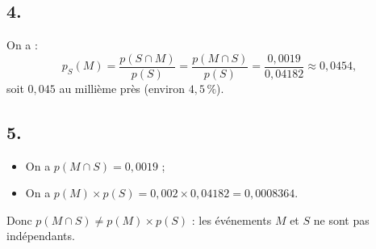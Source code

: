 \documentclass[10pt]{article}
\begin{document}
\subsection*{4.}

On a :
\[
p_S(M) = \dfrac{p(S \cap M)}{p(S)} = \dfrac{p(M \cap S)}{p(S)} = \dfrac{0{,}0019}{0{,}04182} \approx 0{,}0454,
\]
soit \(0{,}045\) au millième près (environ \(4{,}5 \, \% \)).

\subsection*{5.}

\begin{itemize}
    \item On a \( p(M \cap S) = 0{,}0019\) ;
    \item On a \( p(M) \times p(S) = 0{,}002 \times 0{,}04182 = 0{,}0008364\).
\end{itemize}
Donc \( p(M \cap S) \neq p(M) \times p(S) \) : les événements \( M \) et \( S \) ne sont pas indépendants.
\end{document}
